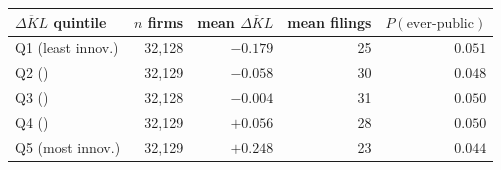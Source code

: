 \begin{tabular}{lrrrr}
\toprule
$\overline{\Delta KL}$ quintile & $n$ firms & mean $\overline{\Delta KL}$ & mean filings & $P(\text{ever-public})$ \\
\midrule
Q1 (least innov.) & 32,128 & $-0.179$ & 25 & $0.051$ \\
Q2 () & 32,129 & $-0.058$ & 30 & $0.048$ \\
Q3 () & 32,128 & $-0.004$ & 31 & $0.050$ \\
Q4 () & 32,129 & $+0.056$ & 28 & $0.050$ \\
Q5 (most innov.) & 32,129 & $+0.248$ & 23 & $0.044$ \\
\bottomrule
\end{tabular}
